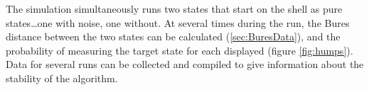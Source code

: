 The simulation simultaneously runs two states that start on the shell
as pure states\dots one with noise, one without.
At several times during the run, the Bures distance between the
two states can be calculated (\ref{sec:BuresData}), and the
probability of measuring the target state for each displayed
(figure \ref{fig:humps}).  Data for several runs can be collected
and compiled to give information about the stability of the algorithm.


%
%
